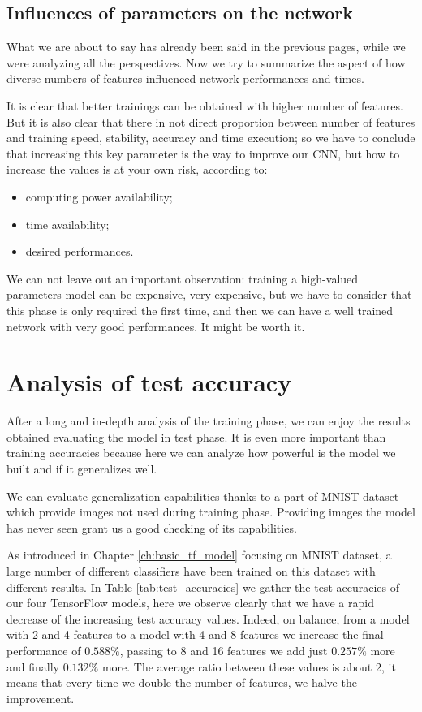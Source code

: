 \subsection{Influences of parameters on the network}

What we are about to say has already been said in the previous pages, while we were analyzing all the perspectives. Now we try to summarize the aspect of how diverse numbers of features influenced network performances and times.

It is clear that better trainings can be obtained with higher number of features. But it is also clear that there in not direct proportion between number of features and training speed, stability, accuracy and time execution; so we have to conclude that increasing this key parameter is the way to improve our \acs{CNN}, but how to increase the values is at your own risk, according to:
\begin{itemize}
	\item computing power availability;
	\item time availability;
	\item desired performances.
\end{itemize}

We can not leave out an important observation: training a high-valued parameters model can be expensive, very expensive, but we have to consider that this phase is only required the first time, and then we can have a well trained network with very good performances. It might be worth it.

\section{Analysis of test accuracy}

After a long and in-depth analysis of the training phase, we can enjoy the results obtained evaluating the model in test phase. It is even more important than training accuracies because here we can analyze how powerful is the model we built and if it generalizes well.

We can evaluate generalization capabilities thanks to a part of MNIST dataset which provide images not used during training phase. Providing images the model has never seen grant us a good checking of its capabilities.

As introduced in Chapter \ref{ch:basic_tf_model} focusing on MNIST dataset, a large number of different classifiers have been trained on this dataset with different results. In Table \ref{tab:test_accuracies} we gather the test accuracies of our four TensorFlow models, here we observe clearly that we have a rapid decrease of the increasing test accuracy values. Indeed, on balance, from a model with 2 and 4 features to a model with 4 and 8 features we increase the final performance of $0.588 \%$, passing to 8 and 16 features we add just $0.257 \%$ more and finally $0.132 \%$ more. The average ratio between these values is about 2, it means that every time we double the number of features, we halve the improvement.

